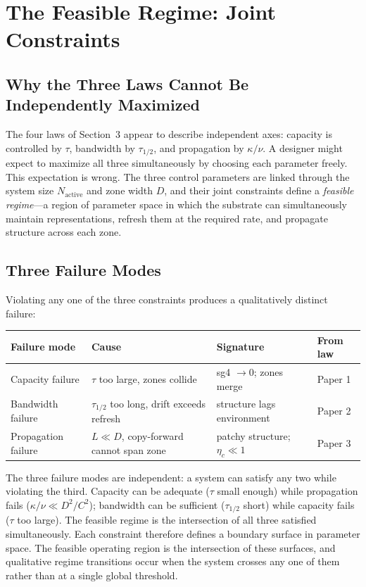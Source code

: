 \documentclass[11pt]{article}
\begin{document}
\section{The Feasible Regime: Joint Constraints}
\label{sec:feasible}

\subsection{Why the Three Laws Cannot Be Independently Maximized}

The four laws of Section~3 appear to describe independent axes: capacity is controlled by $\tau$, bandwidth by $\tau_{1/2}$, and propagation by $\kappa/\nu$.
A designer might expect to maximize all three simultaneously by choosing each parameter freely.
This expectation is wrong.
The three control parameters are linked through the system size $N_{\text{active}}$ and zone width $D$, and their joint constraints define a \emph{feasible regime}---a region of parameter space in which the substrate can simultaneously maintain representations, refresh them at the required rate, and propagate structure across each zone.

\subsection{Three Failure Modes}

Violating any one of the three constraints produces a qualitatively distinct failure:

\begin{center}
\begin{tabular}{llll}
\toprule
\textbf{Failure mode} & \textbf{Cause} & \textbf{Signature} & \textbf{From law} \\
\midrule
Capacity failure & $\tau$ too large, zones collide & sg4 $\to 0$; zones merge & Paper 1 \\
Bandwidth failure & $\tau_{1/2}$ too long, drift exceeds refresh & structure lags environment & Paper 2 \\
Propagation failure & $L \ll D$, copy-forward cannot span zone & patchy structure; $\eta_c \ll 1$ & Paper 3 \\
\bottomrule
\end{tabular}
\end{center}

The three failure modes are independent: a system can satisfy any two while violating the third.
Capacity can be adequate ($\tau$ small enough) while propagation fails ($\kappa/\nu \ll D^2/C^2$);
bandwidth can be sufficient ($\tau_{1/2}$ short) while capacity fails ($\tau$ too large).
The feasible regime is the intersection of all three satisfied simultaneously.
Each constraint therefore defines a boundary surface in parameter space. The feasible operating region is the intersection of these surfaces, and qualitative regime transitions occur when the system crosses any one of them rather than at a single global threshold.
\end{document}
